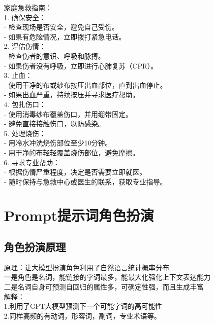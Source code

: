 \documentclass[12pt]{book}
\begin{document}
\begin{tcolorbox}
家庭急救指南：\\

1. 确保安全：\\
- 检查现场是否安全，避免自己受伤。\\
- 如果有危险情况，立即拨打紧急电话。\\

2. 评估伤情：\\
- 检查伤者的意识、呼吸和脉搏。\\
- 如果伤者没有呼吸，立即进行心肺复苏（CPR）。\\

3. 止血：\\
- 使用干净的布或纱布按压出血部位，直到出血停止。\\
- 如果出血严重，持续按压并寻求医疗帮助。\\

4. 包扎伤口：\\
- 使用消毒纱布覆盖伤口，并用绷带固定。\\
- 避免直接接触伤口，以防感染。\\

5. 处理烧伤：\\
- 用冷水冲洗烧伤部位至少10分钟。\\
- 用干净的布轻轻覆盖烧伤部位，避免摩擦。\\

6. 寻求专业帮助：\\
- 根据伤情严重程度，决定是否需要立即就医。\\
- 随时保持与急救中心或医生的联系，获取专业指导。\\

\end{tcolorbox}	


\chapter{Prompt提示词角色扮演}
\section{角色扮演原理}
原理：让大模型扮演角色利用了自然语言统计概率分布\\
一是角色是名词，能链接的字词最多，能最大化强化上下文表达能力\\
二是名词自身可预测自回归的属性多，可确定性强，而且生成丰富\\
解释：\\
1.利用了GPT大模型预测下一个可能字词的高可能性 \\
2.同样高频的有动词，形容词，副词，专业术语等。
\end{document}
